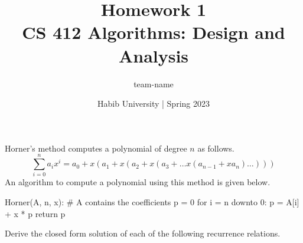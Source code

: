 \documentclass[addpoints]{exam}
\title{Homework 1\\ CS 412 Algorithms: Design and Analysis}
\author{team-name}  %
\date{Habib University | Spring 2023}
\begin{document}
\maketitle

\begin{questions}

  \question
  Horner's method computes a polynomial of degree $n$ as follows.
  \[
    \sum_{i=0}^n a_ix^i = a_0 + x(a_1 + x(a_2 + x(a_3 + \ldots x(a_{n-1}+xa_n)\ldots)) )
  \]
  An algorithm to compute a polynomial using this method is given below.
\begin{python}
Horner(A, n, x):
  # A contains the coefficients
  p = 0
  for i = n downto 0:
    p = A[i] + x * p
  return p
\end{python}

  \begin{solution}
    \begin{parts}
      \part 
      \part 
    \end{parts}
  \end{solution}

  \question Derive the closed form solution of each of the following recurrence relations.


\end{questions}
\end{document}
